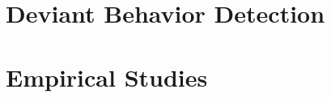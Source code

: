 \documentclass[twoside,11pt]{MPSthesis}
\begin{document}
\cleardoublepage

\newpage \thispagestyle{empty}

\cleardoublepage

\newpage \thispagestyle{empty}

\mainmatter
\mychapterstyle

%
%


\newpage \thispagestyle{empty}


\newpage \thispagestyle{empty}


%
%
\part{Deviant Behavior Detection}
\label{part:theory}


\newpage \thispagestyle{empty}


\newpage \thispagestyle{empty}


\newpage \thispagestyle{empty}

%


\newpage \thispagestyle{empty}


\newpage \thispagestyle{empty}

%
%
\part{Empirical Studies}
\label{part:applications}


\newpage \thispagestyle{empty}


\newpage \thispagestyle{empty}


\newpage \thispagestyle{empty}


%
%


\newpage \thispagestyle{empty}


\newpage \thispagestyle{empty}



%
%
\end{document}
